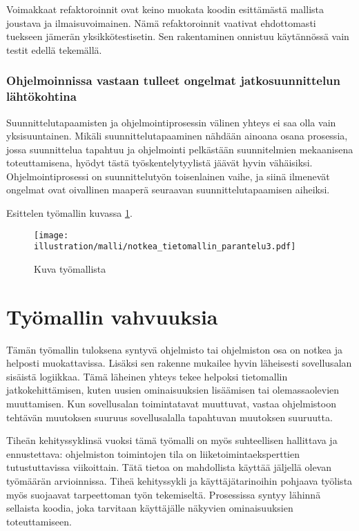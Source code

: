 Voimakkaat refaktoroinnit ovat keino muokata koodin esittämästä mallista
joustava ja ilmaisuvoimainen. Nämä refaktoroinnit vaativat ehdottomasti
tuekseen jämerän yksikkötestisetin. Sen rakentaminen onnistuu
käytännössä vain testit edellä tekemällä.

\hypertarget{ohjelmoinnissa-vastaan-tulleet-ongelmat-jatkosuunnittelun-luxe4htuxf6kohtina}{%
\subsubsection{Ohjelmoinnissa vastaan tulleet ongelmat jatkosuunnittelun
lähtökohtina}\label{ohjelmoinnissa-vastaan-tulleet-ongelmat-jatkosuunnittelun-luxe4htuxf6kohtina}}

Suunnittelutapaamisten ja ohjelmointiprosessin välinen yhteys ei saa
olla vain yksisuuntainen. Mikäli suunnittelutapaaminen nähdään ainoana
osana prosessia, jossa suunnittelua tapahtuu ja ohjelmointi pelkästään
suunnitelmien mekaanisena toteuttamisena, hyödyt tästä
työskentelytyylistä jäävät hyvin vähäisiksi. Ohjelmointiprosessi on
suunnittelutyön toisenlainen vaihe, ja siinä ilmenevät ongelmat ovat
oivallinen maaperä seuraavan suunnittelutapaamisen aiheiksi.

Esittelen työmallin kuvassa \ref{tyomalli}.

\begin{figure}
\centering
\texttt{[image: illustration/malli/notkea\_tietomallin\_parantelu3.pdf]}
\caption{\label{tyomalli} Kuva työmallista}
\end{figure}

\hypertarget{tyuxf6mallin-vahvuuksia}{%
\section{Työmallin vahvuuksia}\label{tyuxf6mallin-vahvuuksia}}

Tämän työmallin tuloksena syntyvä ohjelmisto tai ohjelmiston osa on
notkea ja helposti muokattavissa. Lisäksi sen rakenne mukailee hyvin
läheisesti sovellusalan sisäistä logiikkaa. Tämä läheinen yhteys tekee
helpoksi tietomallin jatkokehittämisen, kuten uusien ominaisuuksien
lisäämisen tai olemassaolevien muuttamisen. Kun sovellusalan
toimintatavat muuttuvat, vastaa ohjelmistoon tehtävän muutoksen suuruus
sovellusalalla tapahtuvan muutoksen suuruutta.

Tiheän kehityssyklinsä vuoksi tämä työmalli on myös suhteellisen
hallittava ja ennustettava: ohjelmiston toimintojen tila on
liiketoimintaeksperttien tutustuttavissa viikoittain. Tätä tietoa on
mahdollista käyttää jäljellä olevan työmäärän arvioinnissa. Tiheä
kehityssykli ja käyttäjätarinoihin pohjaava työlista myös suojaavat
tarpeettoman työn tekemiseltä. Prosessissa syntyy lähinnä sellaista
koodia, joka tarvitaan käyttäjälle näkyvien ominaisuuksien
toteuttamiseen.


